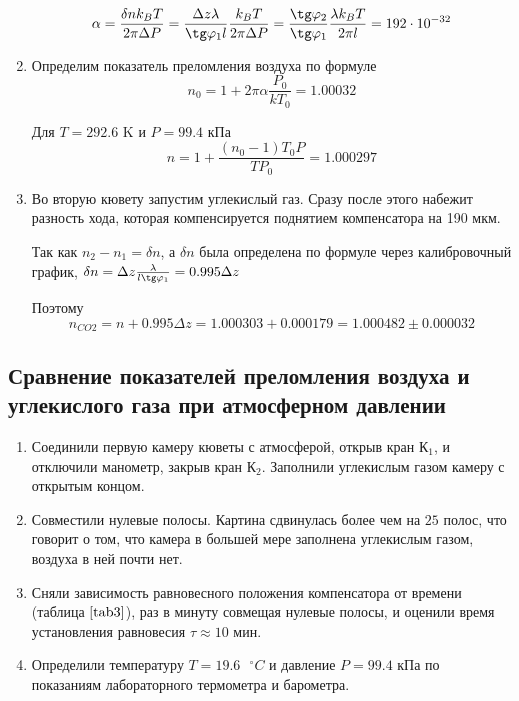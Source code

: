 \documentclass[a4paper,12pt]{article} %
\begin{document}
\begin{enumerate}
\begin{equation}
\alpha = \frac{\delta n k_B T}{2 \pi \Delta P} = \frac{\Delta z \lambda}{\tg \varphi_1 l} \frac{k_B T}{2 \pi \Delta P} =\frac{\tg \varphi_2}{\tg \varphi_1} \frac{\lambda k_B T}{2 \pi l} = 192 \cdot 10^{-32}
\end{equation}

\item Определим показатель преломления воздуха по формуле
\begin{equation}
    n_0 = 1 + 2\pi\alpha \frac{P_0}{kT_0} = 1.00032
\end{equation}

Для $T = 292.6$ K и $P = 99.4$ кПа
\begin{equation}
    n = 1 + \frac{(n_0 - 1)T_0 P}{T P_0} = 1.000297
\end{equation}

\item Во вторую кювету запустим углекислый газ. Сразу после этого набежит разность хода, которая компенсируется поднятием компенсатора на 190 мкм.

Так как $n_2 - n_1 = \delta n$, а $\delta n$ была определена по формуле через калибровочный график, $\delta n = \Delta z \frac{\lambda}{l \tg \varphi_1} = 0.995 \Delta z$

Поэтому 
\begin{equation}
    n_{CO2} = n + 0.995\Delta z = 1.000303 + 0.000179 = 1.000482 \pm 0.000032
\end{equation} 
\end{enumerate}

\subsection{Сравнение показателей преломления воздуха и углекислого газа при атмосферном давлении}

\begin{enumerate}
    \item Соединили первую камеру кюветы с атмосферой, открыв кран $\text{К}_1$, и отключили манометр, закрыв кран $\text{К}_2$. Заполнили углекислым газом камеру с открытым концом.
    \item Совместили нулевые полосы. Картина сдвинулась более чем на $25$ полос, что говорит о том, что камера в большей мере заполнена углекислым газом, воздуха в ней почти нет.
    \item Сняли зависимость равновесного положения компенсатора от времени (таблица $\ref{tab3}$), раз в минуту совмещая нулевые полосы, и оценили время установления равновесия $\tau\approx10\text{ мин}$.
    \item Определили температуру $T=19.6\text{ }^{\circ}C$ и давление $P=99.4\text{ кПа}$ по показаниям лабораторного термометра и барометра.

\end{enumerate}
\end{document}
